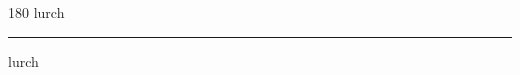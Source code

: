 
\begin{frame}
\begin{center}
\begin{turn}{180}
{\fontsize{2.5cm}{1em}\selectfont lurch}
\end{turn}
\vspace{1em}\par  
\hrule
\vspace{1em}\par  
{\fontsize{2.5cm}{1em}\selectfont lurch}
\end{center}
\end{frame}
